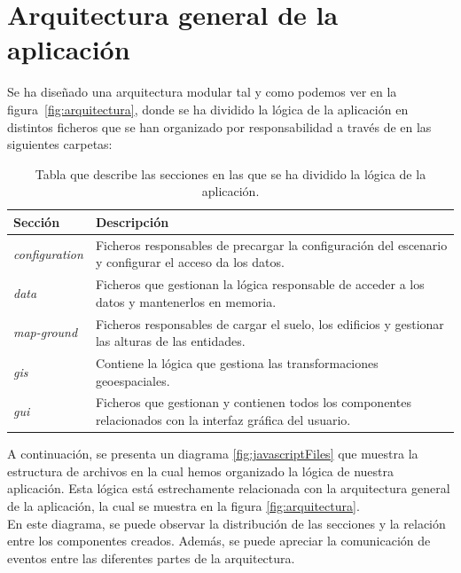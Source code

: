 \documentclass[a4paper, 11pt]{book}
\begin{document}
\section{Arquitectura general de la aplicación} 
\label{sec:arquitectura}
Se ha diseñado una arquitectura modular tal y como podemos ver en la figura~\ref{fig:arquitectura}, donde se ha dividido la lógica de la aplicación en distintos ficheros que se han organizado por responsabilidad a través de en las siguientes carpetas:
\begin{table}[h]
	\begin{center}
		\begin{tabular}{|l|p{13cm}|}
			\hline
			\textbf{Sección} & \textbf{Descripción} \\
			\hline
			\emph{configuration} & Ficheros responsables de precargar la configuración del escenario y configurar el acceso da los datos. \\\hline
			\emph{data} & Ficheros que gestionan la lógica responsable de acceder a los datos y mantenerlos en memoria. \\\hline
			\emph{map-ground} & Ficheros responsables de cargar el suelo, los edificios y gestionar las alturas de las entidades. \\\hline
			\emph{gis} & Contiene la lógica que gestiona las transformaciones geoespaciales. \\\hline
			\emph{gui} & Ficheros que gestionan y contienen todos los componentes relacionados con la interfaz gráfica del usuario.\\\hline
		\end{tabular}
		\caption{Tabla que describe las secciones en las que se ha dividido la lógica de la aplicación.}
	\end{center}
\end{table}
A continuación, se presenta un diagrama \ref{fig:javascriptFiles} que muestra la estructura de archivos en la cual hemos organizado la lógica de nuestra aplicación. 
Esta lógica está estrechamente relacionada con la arquitectura general de la aplicación, la cual se muestra en la figura \ref{fig:arquitectura}. \\
En este diagrama, se puede observar la distribución de las secciones y la relación entre los componentes creados. Además, se puede apreciar la comunicación de eventos entre las diferentes partes de la arquitectura.
\end{document}
